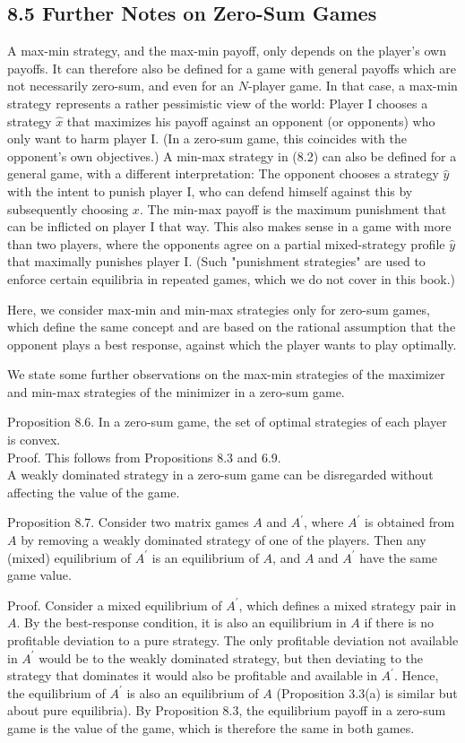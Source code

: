 \documentclass[12pt]{article}
\begin{document}
\subsection*{8.5 Further Notes on Zero-Sum Games}
A max-min strategy, and the max-min payoff, only depends on the player's own payoffs. It can therefore also be defined for a game with general payoffs which are not necessarily zero-sum, and even for an $N$-player game. In that case, a max-min strategy represents a rather pessimistic view of the world: Player I chooses a\\
strategy $\hat{x}$ that maximizes his payoff against an opponent (or opponents) who only want to harm player I. (In a zero-sum game, this coincides with the opponent's own objectives.) A min-max strategy in (8.2) can also be defined for a general game, with a different interpretation: The opponent chooses a strategy $\hat{y}$ with the intent to punish player I, who can defend himself against this by subsequently choosing $x$. The min-max payoff is the maximum punishment that can be inflicted on player I that way. This also makes sense in a game with more than two players, where the opponents agree on a partial mixed-strategy profile $\hat{y}$ that maximally punishes player I. (Such "punishment strategies" are used to enforce certain equilibria in repeated games, which we do not cover in this book.)

Here, we consider max-min and min-max strategies only for zero-sum games, which define the same concept and are based on the rational assumption that the opponent plays a best response, against which the player wants to play optimally.

We state some further observations on the max-min strategies of the maximizer and min-max strategies of the minimizer in a zero-sum game.

Proposition 8.6. In a zero-sum game, the set of optimal strategies of each player is convex.\\
Proof. This follows from Propositions 8.3 and 6.9.\\
A weakly dominated strategy in a zero-sum game can be disregarded without affecting the value of the game.

Proposition 8.7. Consider two matrix games $A$ and $A^{\prime}$, where $A^{\prime}$ is obtained from $A$ by removing a weakly dominated strategy of one of the players. Then any (mixed) equilibrium of $A^{\prime}$ is an equilibrium of $A$, and $A$ and $A^{\prime}$ have the same game value.

Proof. Consider a mixed equilibrium of $A^{\prime}$, which defines a mixed strategy pair in $A$. By the best-response condition, it is also an equilibrium in $A$ if there is no profitable deviation to a pure strategy. The only profitable deviation not available in $A^{\prime}$ would be to the weakly dominated strategy, but then deviating to the strategy that dominates it would also be profitable and available in $A^{\prime}$. Hence, the equilibrium of $A^{\prime}$ is also an equilibrium of $A$ (Proposition 3.3(a) is similar but about pure equilibria). By Proposition 8.3, the equilibrium payoff in a zero-sum game is the value of the game, which is therefore the same in both games.
\end{document}
